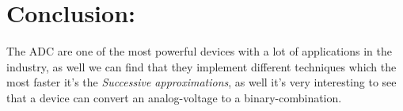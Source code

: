 \section{Conclusion:}

The ADC are one of the most powerful devices with a lot of applications in the industry, as well we can find that they implement different techniques which the most faster it's the {\itshape Successive approximations}, as well it's very interesting to see that a device can convert an analog-voltage to a binary-combination.

\pagebreak